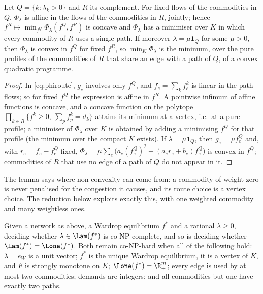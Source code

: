 \begin{lemma}\label{lem:concave}
Let $Q=\{k:\lambda_k>0\}$ and $R$ its complement. For fixed flows of the commodities in $Q$, $\Phi_\lambda$ is affine in the flows of the commodities in $R$, jointly; hence $f^R\mapsto\min_{f^Q}\Phi_\lambda(f^Q,f^R)$ is concave and $\Phi_\lambda$ has a minimiser over $K$ in which every commodity of $R$ uses a single path. If moreover $\lambda=\mu\mathbf 1_Q$ for some $\mu>0$, then $\Phi_\lambda$ is convex in $f^Q$ for fixed $f^R$, so $\min_K\Phi_\lambda$ is the minimum, over the pure profiles of the commodities of $R$ that share an edge with a path of $Q$, of a convex quadratic programme. 
\end{lemma}
\begin{proof}
In \eqref{eq:phiroute}, $g_e$ involves only $f^Q$, and $f_e=\sum_kf^k_e$ is linear in the path flows; so for fixed $f^Q$ the expression is affine in $f^R$. A pointwise infimum of affine functions is concave, and a concave function on the polytope $\prod_{k\in R}\{f^k\ge0,\ \sum_pf^k_p=d_k\}$ attains its minimum at a vertex, i.e.\ at a pure profile; a minimiser of $\Phi_\lambda$ over $K$ is obtained by adding a minimising $f^Q$ for that profile (the minimum over the compact $K$ exists). If $\lambda=\mu\mathbf 1_Q$, then $g_e=\mu f^Q_e$ and, with $r_e=f_e-f^Q_e$ fixed, $\Phi_\lambda=\mu\sum_e\big(a_e(f^Q_e)^2+(a_er_e+b_e)f^Q_e\big)$ is convex in $f^Q$; commodities of $R$ that use no edge of a path of $Q$ do not appear in it.
\end{proof}

The lemma says where non-convexity can come from: a commodity of weight zero is never penalised for the congestion it causes, and its route choice is a vertex choice. The reduction below exploits exactly this, with one weighted commodity and many weightless ones.

\begin{theorem}\label{thm:routinghard}
Given a network as above, a Wardrop equilibrium $f^*$ and a rational $\lambda\ge0$, deciding whether $\lambda\in\Lam(f^*)$ is co-NP-complete, and so is deciding whether $\Lam(f^*)=\Lone(f^*)$. Both remain co-NP-hard when all of the following hold: $\lambda=e_W$ is a unit vector; $f^*$ is the unique Wardrop equilibrium, it is a vertex of $K$, and $F$ is strongly monotone on $K$; $\Lone(f^*)=\R^m_+$; every edge is used by at most two commodities; demands are integers; and all commodities but one have exactly two paths. 
\end{theorem}

